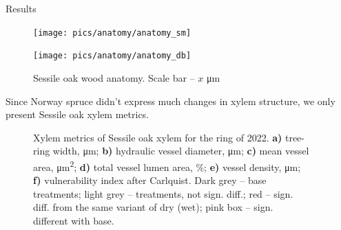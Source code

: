 \documentclass[final]{beamer}
\newlength{\sepwidth}
\newlength{\colwidth}
\newcommand{\separatorcolumn}{\begin{column}{\sepwidth}\end{column}}
\begin{document}
\begin{frame}[t]
\begin{columns}[t]
\begin{column}{\colwidth}
\end{column}


\begin{column}{\colwidth}

\begin{block}{Results}
        \begin{figure}
            \begin{minipage}{0.45\textwidth}
                \centering \texttt{[image: pics/anatomy/anatomy\_sm]}
                \caption{Spruce wood anatomy. Scale bar -- $x$ \si{\micro\meter}}
                \label{fig:anatomy_sm}
            \end{minipage}\hfill
            \begin{minipage}{0.45\textwidth}
                \centering \texttt{[image: pics/anatomy/anatomy\_db]}
                \caption{Sessile oak wood anatomy. Scale bar -- $x$ \si{\micro\meter}}
                \label{fig:anatomy_db}
            \end{minipage}\hfill
        \end{figure}
\end{block}
    Since Norway spruce didn't express much changes in xylem structure, we only present Sessile oak xylem metrics.
        \begin{figure}
            
            \caption{
                Xylem metrics of Sessile oak xylem for the ring of 2022. 
                \textbf{a)} tree-ring width, \si{\micro\meter};
                \textbf{b)} hydraulic vessel diameter, \si{\micro\meter};
                \textbf{c)} mean vessel area, \si{\micro\meter\squared};
                \textbf{d)} total vessel lumen area, \%;
                \textbf{e)} vessel density, \si{\micro\meter};
                \textbf{f)} vulnerability index after Carlquist.
                Dark grey -- base treatments; light grey -- treatments, not sign. diff.; red -- sign. diff. from the same variant of dry (wet); pink box -- sign. different with base.
            }
            \label{fig:xmg}
        \end{figure}

\end{column}
\end{columns}


\end{frame}
\end{document}
